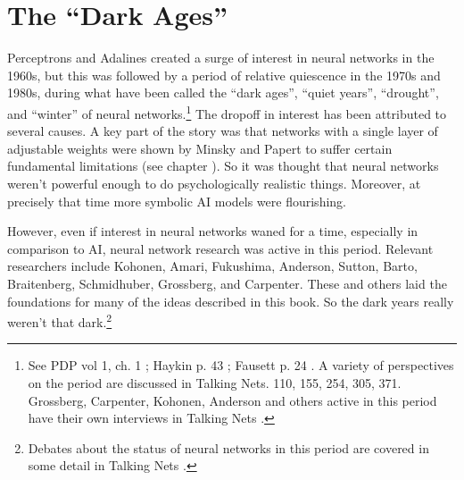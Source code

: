 \section{The ``Dark Ages''}\label{dark_ages}


Perceptrons and Adalines created a surge of interest in neural networks in the 1960s, but this was followed by a period of relative quiescence in the 1970s and 1980s, during what have been called the ``dark ages'', ``quiet years'', ``drought'', and ``winter'' of neural networks.\footnote{See PDP vol 1, ch. 1 \cite{rumelhart1986parallel}; Haykin p. 43 \cite{haykin1998neural}; Fausett p. 24 \cite{fausett1994fundamentals}. A variety of perspectives on the period are discussed in Talking Nets. 110, 155, 254, 305, 371. Grossberg, Carpenter, Kohonen, Anderson and others active in this period have their own interviews in Talking Nets \cite{anderson2000talking}.}  The dropoff in interest has been attributed to several causes. A key part of the story was that networks with a single layer of adjustable weights were shown by Minsky and Papert to suffer certain fundamental limitations \cite{minsky1969perceptrons} (see chapter ). So it was thought that neural networks weren't powerful enough to do psychologically realistic things. Moreover, at precisely that time more symbolic AI models were flourishing. 

However, even if interest in neural networks waned for a time, especially in comparison to AI, neural network research was active in this period. Relevant researchers include Kohonen, Amari, Fukushima, Anderson, Sutton, Barto, Braitenberg, Schmidhuber, Grossberg, and Carpenter. These and others laid the foundations for many of the ideas described in this book. So the dark years really weren't that dark.\footnote{Debates about the status of neural networks in this period are covered in some detail in Talking Nets \cite{anderson2000talking}.} 

